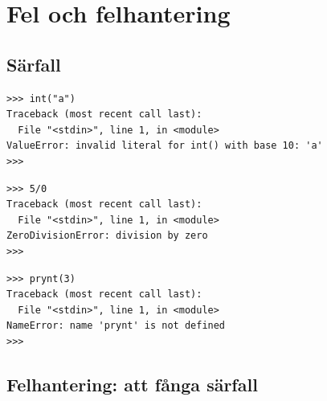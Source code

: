 \mode*

\section{Fel och felhantering}

\subsection{Särfall}

\begin{frame}[fragile]
  \begin{example}
    \begin{lstlisting}
>>> int("a")
Traceback (most recent call last):
  File "<stdin>", line 1, in <module>
ValueError: invalid literal for int() with base 10: 'a'
>>> 
    \end{lstlisting}
  \end{example}
\end{frame}

\begin{frame}[fragile]
  \begin{example}
    \begin{lstlisting}
>>> 5/0
Traceback (most recent call last):
  File "<stdin>", line 1, in <module>
ZeroDivisionError: division by zero
>>> 
    \end{lstlisting}
  \end{example}
\end{frame}

\begin{frame}[fragile]
  \begin{example}
    \begin{lstlisting}
>>> prynt(3)
Traceback (most recent call last):
  File "<stdin>", line 1, in <module>
NameError: name 'prynt' is not defined
>>> 
    \end{lstlisting}
  \end{example}
\end{frame}

\subsection{Felhantering: att fånga särfall}

